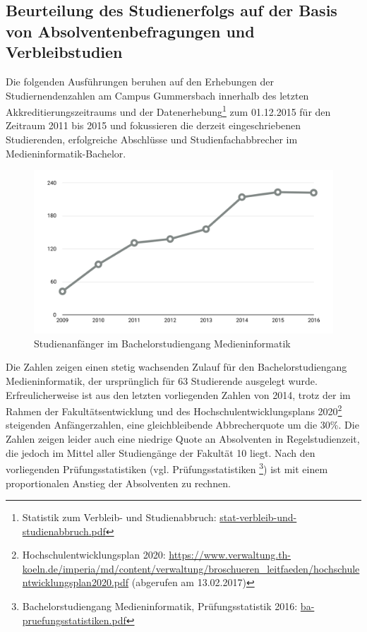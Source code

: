 \subsection{Beurteilung des Studienerfolgs auf der Basis von
Absolventenbefragungen und
Verbleibstudien}\label{beurteilung-des-studienerfolgs-auf-der-basis-von-absolventenbefragungen-und-verbleibstudien}

Die folgenden Ausführungen beruhen auf den Erhebungen der
Studiernendenzahlen am Campus Gummersbach innerhalb des letzten
Akkreditierungszeitraums und der Datenerhebung\footnote{Statistik zum
  Verbleib- und Studienabbruch:
  \href{../anhaenge/stat-verbleib-und-studienabbruch.pdf}{stat-verbleib-und-studienabbruch.pdf}}
zum 01.12.2015 für den Zeitraum 2011 bis 2015 und fokussieren die
derzeit eingeschriebenen Studierenden, erfolgreiche Abschlüsse und
Studienfachabbrecher im Medieninformatik-Bachelor.

\begin{figure}[htbp]
\centering
\includegraphics[width=\columnwidth]{../anhaenge/bilder/ba-anfaengerzahlen.png}
\caption{Studienanfänger im Bachelorstudiengang Medieninformatik}
\end{figure}

Die Zahlen zeigen einen stetig wachsenden Zulauf für den
Bachelorstudiengang Medieninformatik, der ursprünglich für 63
Studierende ausgelegt wurde. Erfreulicherweise ist aus den letzten
vorliegenden Zahlen von 2014, trotz der im Rahmen der
Fakultätsentwicklung und des Hochschulentwicklungsplans 2020\footnote{Hochschulentwicklungsplan
  2020:
  \url{https://www.verwaltung.th-koeln.de/imperia/md/content/verwaltung/broschueren\_leitfaeden/hochschulentwicklungsplan2020.pdf}
  (abgerufen am 13.02.2017)} steigenden Anfängerzahlen, eine
gleichbleibende Abbrecherquote um die 30\%. Die Zahlen zeigen leider
auch eine niedrige Quote an Absolventen in Regelstudienzeit, die jedoch
im Mittel aller Studiengänge der Fakultät 10 liegt. Nach den
vorliegenden Prüfungsstatistiken (vgl. Prüfungsstatistiken \footnote{Bachelorstudiengang
  Medieninformatik, Prüfungsstatistik 2016:
  \href{../anhaenge/ba-pruefungsstatistiken.pdf}{ba-pruefungsstatistiken.pdf}})
ist mit einem proportionalen Anstieg der Absolventen zu rechnen.

